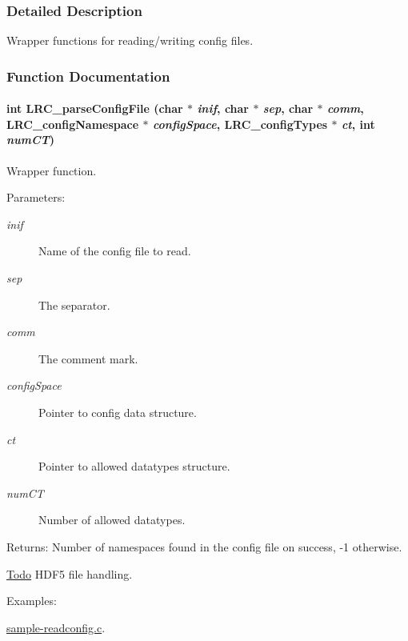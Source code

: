 \subsubsection{Detailed Description}
Wrapper functions for reading/writing config files. 

\subsubsection{Function Documentation}
\hypertarget{group___l_r_c__wrappers_g98adf1a77ae325830d4521b691ca33b0}{
\paragraph[{LRC\_\-parseConfigFile}]{\setlength{\rightskip}{0pt plus 5cm}int LRC\_\-parseConfigFile (char $\ast$ {\em inif}, \/  char $\ast$ {\em sep}, \/  char $\ast$ {\em comm}, \/  {\bf LRC\_\-configNamespace} $\ast$ {\em configSpace}, \/  {\bf LRC\_\-configTypes} $\ast$ {\em ct}, \/  int {\em numCT})}\hfill}
\label{group___l_r_c__wrappers_g98adf1a77ae325830d4521b691ca33b0}


Wrapper function. 

\begin{Desc}
\item[Parameters:]
\begin{description}
\item[{\em inif}]Name of the config file to read.\item[{\em sep}]The separator.\item[{\em comm}]The comment mark.\item[{\em configSpace}]Pointer to config data structure.\item[{\em ct}]Pointer to allowed datatypes structure.\item[{\em numCT}]Number of allowed datatypes.\end{description}
\end{Desc}
\begin{Desc}
\item[Returns:]Number of namespaces found in the config file on success, -1 otherwise.\end{Desc}
\begin{Desc}
\item[\hyperlink{todo__todo000008}{Todo}]HDF5 file handling. \end{Desc}
\begin{Desc}
\item[Examples: ]\par
\hyperlink{sample-readconfig_8c-example}{sample-readconfig.c}.\end{Desc}


